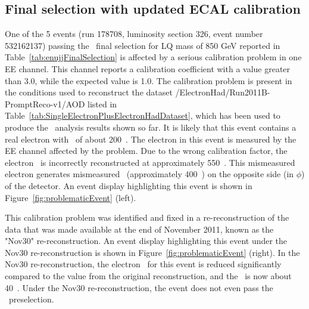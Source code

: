 \subsection{Final selection with updated ECAL calibration}
\label{sec:enujjFinalSelectionUpdate}

One of the 5 events (run 178708, luminosity section 326, event number 532162137) 
passing the \enujj~final selection for LQ mass of 850 GeV reported 
in Table~\ref{tab:enujjFinalSelection} is affected by a serious calibration problem 
in one EE channel.  This channel reports a calibration coefficient
with a value greater than 3.0, while the expected value is 1.0.
The calibration problem is present in the conditions used to reconstruct
the dataset /ElectronHad/Run2011B-PromptReco-v1/AOD
listed in Table~\ref{tab:SingleElectronPlusElectronHadDataset}, which has 
been used to produce the \enujj~analysis results shown so far.
It is likely that this event contains a real electron with \pt~of about 200~\GeV.
The electron in this event is measured by the EE channel affected by the problem.  
Due to the wrong calibration factor, the electron \pt~is incorrectly reconstructed at 
approximately 550~\GeV. This mismeasured electron generates mismeasured \MET~(approximately 400~\GeV) 
on the opposite side (in $\phi$) of the detector. 
An event display highlighting this event is shown in Figure~\ref{fig:problematicEvent} (left).

This calibration problem was identified and fixed in a re-reconstruction of the data
that was made available at the end of November 2011, known as the "Nov30" re-reconstruction.
An event display highlighting this event under the Nov30 re-reconstruction is shown in Figure~\ref{fig:problematicEvent} (right).
In the Nov30 re-reconstruction, the electron \pt~for this event is reduced 
significantly compared to the value from the original reconstruction,
and the \MET~is now about 40~\GeV. Under the Nov30 re-reconstruction,
the event does not even pass the \enujj~preselection. 

